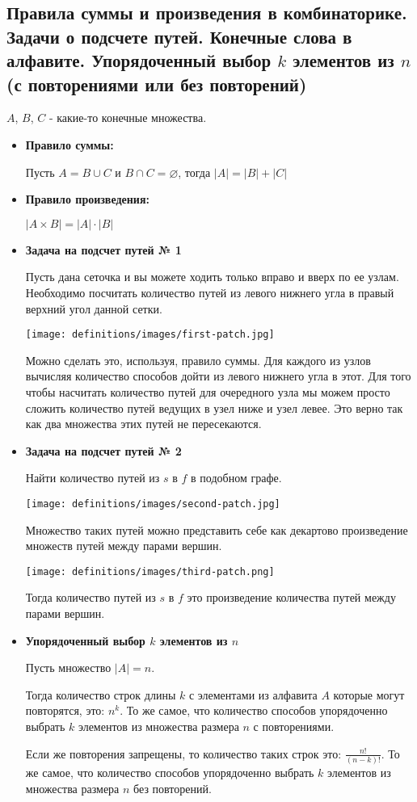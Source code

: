 \subsection{Правила суммы и произведения в комбинаторике. Задачи о подсчете путей. Конечные слова в алфавите. Упорядоченный выбор $k$ элементов из $n$ (с повторениями или без повторений)}

$A$, $B$, $C$ - какие-то конечные множества.
\begin{itemize}
\item \textbf{Правило суммы:}

Пусть $A = B \cup C$ и $B \cap C = \varnothing$, тогда $|A| = |B| + |C|$

\item \textbf{Правило произведения:}

$|A \times B| = |A| \cdot |B|$

\item \textbf{Задача на подсчет путей № 1}

Пусть дана сеточка и вы можете ходить только вправо и вверх по ее узлам. Необходимо посчитать количество путей из левого нижнего угла в правый верхний угол данной сетки.

\texttt{[image: definitions/images/first-patch.jpg]}

Можно сделать это, используя, правило суммы. Для каждого из узлов вычисляя количество способов дойти из левого нижнего угла в этот. Для того чтобы насчитать количество путей для очередного узла мы можем просто сложить количество путей ведущих в узел ниже и узел левее. Это верно так как два множества этих путей не пересекаются.

\item \textbf{Задача на подсчет путей № 2}

Найти количество путей из $s$ в $f$ в подобном графе.

\texttt{[image: definitions/images/second-patch.jpg]}

Множество таких путей можно представить себе как декартово произведение множеств путей между парами вершин.

\texttt{[image: definitions/images/third-patch.png]}

Тогда количество путей из $s$ в $f$ это произведение количества путей между парами вершин.

\item \textbf{Упорядоченный выбор $k$ элементов из $n$}

Пусть множество $|A| = n$.

Тогда количество строк длины $k$ с элементами из алфавита $A$ которые могут повторятся, это: $n^k$. То же самое, что количество способов упорядоченно выбрать $k$ элементов из множества размера $n$ с повторениями.

Если же повторения запрещены, то количество таких строк это: $\frac{n!}{(n-k)!}$. То же самое, что количество способов упорядоченно выбрать $k$ элементов из множества размера $n$ без повторений.
\end{itemize}